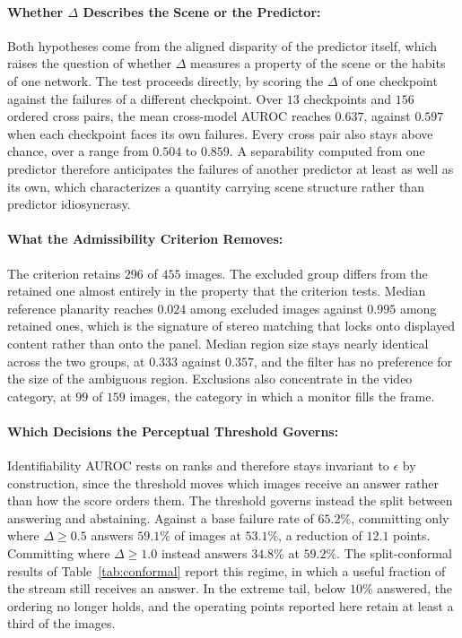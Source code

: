 \documentclass{article} %
\theoremstyle{defstyle}
\theoremstyle{plain}
\begin{document}
\paragraph{Whether $\Delta$ Describes the Scene or the Predictor:}
Both hypotheses come from the aligned disparity of the predictor itself, which raises the
question of whether $\Delta$ measures a property of the scene or the habits of one network. The
test proceeds directly, by scoring the $\Delta$ of one checkpoint against the failures of a
different checkpoint. Over $13$ checkpoints and $156$ ordered cross pairs, the mean
cross-model AUROC reaches $0.637$, against $0.597$ when each checkpoint faces its own
failures. Every cross pair also stays above chance, over a range from $0.504$ to $0.859$. A
separability computed from one predictor therefore anticipates the failures of another
predictor at least as well as its own, which characterizes a quantity carrying scene structure
rather than predictor idiosyncrasy.

\paragraph{What the Admissibility Criterion Removes:}
The criterion retains $296$ of $455$ images. The excluded group differs from the retained one
almost entirely in the property that the criterion tests. Median reference planarity reaches
$0.024$ among excluded images against $0.995$ among retained ones, which is the signature of
stereo matching that locks onto displayed content rather than onto the panel. Median region
size stays nearly identical across the two groups, at $0.333$ against $0.357$, and the filter
has no preference for the size of the ambiguous region. Exclusions also concentrate in the
video category, at $99$ of $159$ images, the category in which a monitor fills the frame.

\paragraph{Which Decisions the Perceptual Threshold Governs:}
Identifiability AUROC rests on ranks and therefore stays invariant to $\epsilon$ by
construction, since the threshold moves which images receive an answer rather than how the
score orders them. The threshold governs instead the split between answering and abstaining.
Against a base failure rate of $65.2\%$, committing only where $\Delta \geq 0.5$ answers
$59.1\%$ of images at $53.1\%$, a reduction of $12.1$ points. Committing where $\Delta \geq
1.0$ instead answers $34.8\%$ at $59.2\%$. The split-conformal results of
Table~\ref{tab:conformal} report this regime, in which a useful fraction of the stream still
receives an answer. In the extreme tail, below $10\%$ answered, the ordering no longer holds,
and the operating points reported here retain at least a third of the images.
\end{document}
